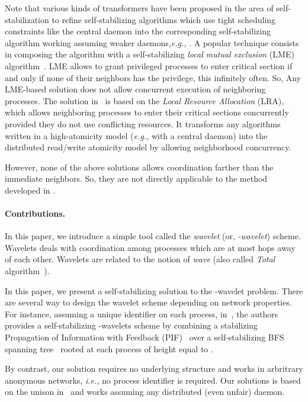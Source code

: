\documentclass[11pt]{article}
\newcommand{\eg}{\emph{e.g., }}
\newcommand{\ie}{\emph{i.e., }}
\begin{document}
Note that various kinds of transformers have been proposed in the area of 
self-stabilization to refine self-stabilizing algorithms which use tight
scheduling constraints like the central daemon into the corresponding
self-stabilizing algorithm working assuming weaker daemons,\eg 
\cite{MN98,GH99,NA02,CDP03}. A popular technique consists in composing the 
algorithm with a self-stabilizing \emph{local mutual exclusion} (LME) 
algorithm~\cite{MN98,GH99,NA02}. 
LME allows to grant privileged processes to enter critical section if and only 
if none of their neighbors has the privilege, this infinitely often. 
So, Any LME-based solution does not allow concurrent execution of neighboring processes. 
The solution in~\cite{CDP03} is based on the \emph{Local Resource Allocation} (LRA), which 
allows neighboring processes to enter their critical sections concurrently provided
they do not use conflicting resources.
It transforms any algorithms written in a high-atomicity model (\eg with a central daemon)
into the distributed read/write atomicity model by allowing neighborhood concurrency.

However, none of the above solutions allows coordination farther than the immediate neighbors.
So, they are not directly applicable to the method developed in \cite{NS93,GGHK04,GHJT06,DNT06}.


\paragraph{Contributions.}

In this paper, we introduce a simple tool called the \emph{wavelet} (or, \emph{-wavelet}) scheme.  
Wavelets deals with coordination among processes which are at most  hops away of each other.  
Wavelets are related to the notion of \emph{wave} (also called \emph{Total} algorithm~\cite{T88,Tel94}).

In this paper, we present a self-stabilizing solution to the -wavelet problem.
There are several way to design the wavelet scheme depending on network properties.   
For instance, assuming a unique identifier on each process, in~\cite{DNT06}, the authors 
provides a self-stabilizing -wavelets scheme by combining a stabilizing Propagation of 
Information with Feedback (PIF)~\cite{BDPV99b} over a self-stabilizing BFS spanning tree~\cite{HC92,J97} 
rooted at each process of height equal to .  

By contrast, our solution requires no underlying structure and works in arbritrary anonymous networks, \ie
no process identifier is required.
Our solutions is based on the unison in~\cite{BPV04b} and works assuming any distributed (even unfair) daemon. 
\end{document}
